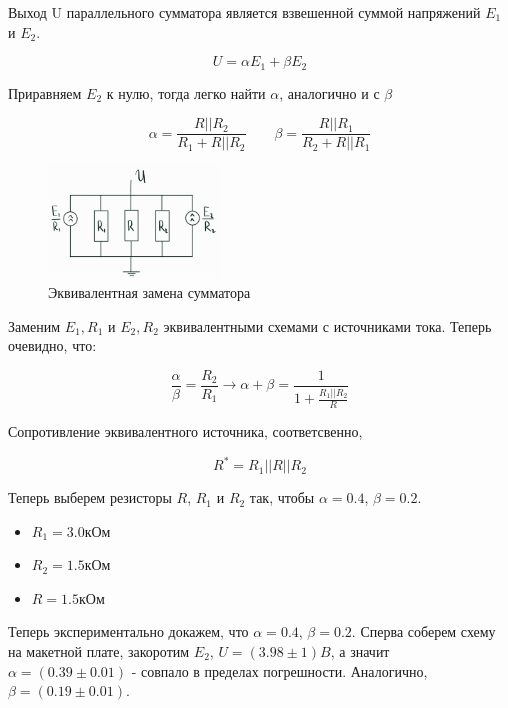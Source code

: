 \documentclass[a4paper]{article}
\begin{document}
Выход U параллельного сумматора является взвешенной суммой напряжений $E_1$ и $E_2$.

\begin{equation}
    U = \alpha E_1 + \beta E_2
\end{equation}

Приравняем $E_2$ к нулю, тогда легко найти $\alpha$, аналогично и с $\beta$

\begin{equation}
    \alpha = \frac{R || R_2}{R_1 + R || R_2} \qquad
    \beta  = \frac{R || R_1}{R_2 + R || R_1}
\end{equation}

\begin{figure}
    \includegraphics[width = 0.40\textwidth]{summator_eq.png}
    \caption[width = 0.85\textwidth]{Эквивалентная замена сумматора}
\end{figure}

Заменим $E_1, R_1$ и $E_2, R_2$ эквивалентными схемами с источниками тока.
Теперь очевидно, что:

\begin{equation}
    \frac{\alpha}{\beta} = \frac{R_2}{R_1} \longrightarrow \alpha + \beta = \frac{1}{1 + \frac{R_1 || R_2}{R}}
\end{equation}

Сопротивление эквивалентного источника, соответсвенно,

\begin{equation}
    R^* = R_1 || R || R_2
\end{equation}

Теперь выберем резисторы $R$, $R_1$ и $R_2$ так, чтобы $\alpha = 0.4$, $\beta = 0.2$.

\begin{itemize}
    \item $R_1 = 3.0 \text{кОм}$
    \item $R_2 = 1.5 \text{кОм}$
    \item $R   = 1.5 \text{кОм}$
\end{itemize}

Теперь экспериментально докажем, что $\alpha = 0.4$, $\beta = 0.2$.
Сперва соберем схему на макетной плате, закоротим $E_2$, \newline
$U = (3.98 \pm 1)B$, а значит $\alpha = (0.39 \pm 0.01)$ - совпало в пределах погрешности.
Аналогично, $\beta = (0.19 \pm 0.01)$.
\end{document}
